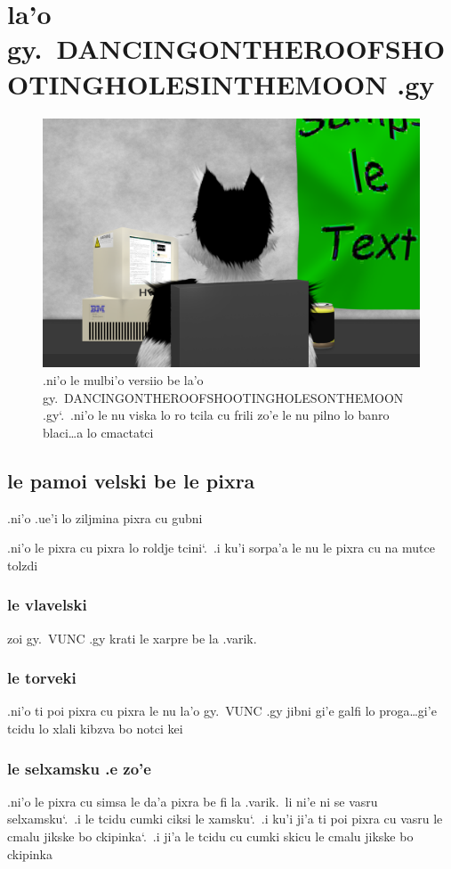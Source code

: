 \documentclass{report}
\newcommand\sds{\spacefactor\sfcode`.\ \space}
\begin{document}
\chapter{la'o gy.\ DANCINGONTHEROOFSHOOTINGHOLESINTHEMOON .gy}
\begin{figure}[ht]
	\centering
	\includegraphics[width=\textwidth]{dancingontheroofshootingholesinthemoon/dancingontheroofshootingholesinthemoon.png}
	\caption[center]{.ni'o le mulbi'o versiio be la'o gy.\ DANCINGONTHEROOFSHOOTINGHOLESONTHEMOON .gy\sds  .ni'o le nu viska lo ro tcila cu frili zo'e le nu pilno lo banro blaci\ldots a lo cmactatci}
\end{figure}
\section{le pamoi velski be le pixra}
.ni'o .ue'i lo ziljmina pixra cu gubni

.ni'o le pixra cu pixra lo roldje tcini\sds  .i ku'i sorpa'a le nu le pixra cu na mutce tolzdi

\subsection{le vlavelski}
zoi gy.\ VUNC .gy krati le xarpre be la .varik.
\subsection{le torveki}
.ni'o ti poi pixra cu pixra le nu la'o gy.\ VUNC .gy jibni gi'e galfi lo proga\ldots gi'e tcidu lo xlali kibzva bo notci kei

\subsection{le selxamsku .e zo'e}
.ni'o le pixra cu simsa le da'a pixra be fi la .varik.\ li ni'e ni se vasru selxamsku\sds  .i le tcidu cumki ciksi le xamsku\sds  .i ku'i ji'a ti poi pixra cu vasru le cmalu jikske bo ckipinka\sds  .i ji'a le tcidu cu cumki skicu le cmalu jikske bo ckipinka
\end{document}
